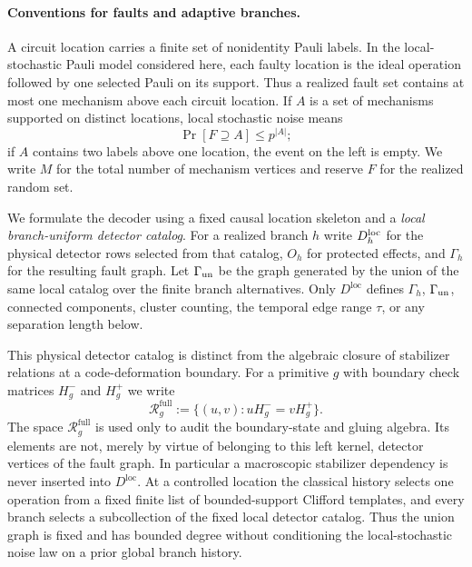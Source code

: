 \documentclass[aps,prx,reprint,superscriptaddress,nofootinbib,floatfix,longbibliography]{revtex4-2}
\theoremstyle{definition}
\begin{document}
\paragraph{Conventions for faults and adaptive branches.}
A circuit location carries a finite set of nonidentity Pauli labels.  In the
local-stochastic Pauli model considered here, each faulty location is the ideal
operation followed by one selected Pauli on its support.  Thus a realized
fault set contains at most one mechanism above each circuit location.  If
$A$ is a set of mechanisms supported on distinct locations, local stochastic
noise means
\begin{equation}
  \Pr[F\supseteq A]\leq p^{|A|};                                      \tag{A1}
\end{equation}
if $A$ contains two labels above one location, the event on the left is empty.
We write $M$ for the total number of mechanism vertices and reserve $F$ for
the realized random set.

We formulate the decoder using a fixed causal location skeleton and a
\emph{local branch-uniform detector catalog}.  For a realized branch $h$ write
$D_h^{\rm loc}$ for the physical detector rows selected from that catalog,
$O_h$ for protected effects, and $\Gamma_h$ for the resulting fault graph.
Let $\Gamma_{\rm un}$ be the graph generated by the union of the same local
catalog over the finite branch alternatives.  Only $D^{\mathrm{loc}}$ defines
$\Gamma_h$, $\Gamma_{\rm un}$, connected components, cluster counting, the
temporal edge range $\tau$, or any separation length below.

This physical detector catalog is distinct from the algebraic closure of stabilizer relations at a code-deformation boundary.  For a
primitive $g$ with boundary check matrices $H_g^-$ and $H_g^+$ we write
\begin{equation}
 \mathcal R_g^{\mathrm{full}}:=\{(u,v):uH_g^-=vH_g^+\}.                 \tag{A2}
\end{equation}
The space $\mathcal R_g^{\mathrm{full}}$ is used only to audit the boundary-state
and gluing algebra.  Its elements are not, merely by virtue of belonging to
this left kernel, detector vertices of the fault graph.  In particular a
macroscopic stabilizer dependency is never inserted into $D^{\mathrm{loc}}$.
At a controlled location the classical history selects one operation from a
fixed finite list of bounded-support Clifford templates, and every branch
selects a subcollection of the fixed local detector catalog.  Thus the union
graph is fixed and has bounded degree without conditioning the local-stochastic
noise law on a prior global branch history.
\end{document}
